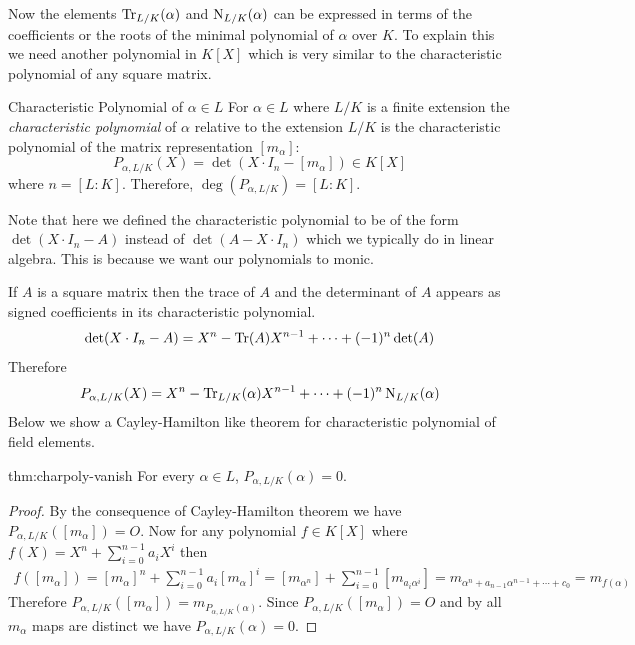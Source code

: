 Now the elements $\operatorname{Tr}_{L/K}(\alpha)$ and $\operatorname{N}_{L/K}(\alpha)$ can be expressed in terms of the coefficients or the roots of the minimal polynomial of $\alpha$ over $K$. To explain this we need another polynomial in $K[X]$ which is very similar to the characteristic polynomial of any square matrix.
\begin{Definition}{Characteristic Polynomial of $\alpha\in L$}{}
  For $\alpha\in L$ where $L/K$ is a finite extension the \emph{characteristic polynomial} of $\alpha$ relative to the extension $L/K$ is the characteristic polynomial of the matrix representation $[m_{\alpha}]$:
  $$P_{\alpha,L/K}(X)=\det(X\cdot I_n-[m_{\alpha}])\in K[X]$$
  where $n=[L\colon K]$. Therefore, $\deg(P_{\alpha,L/K})=[L\colon K]$.
\end{Definition}

Note that here we defined the characteristic polynomial to be of the form $\det(X\cdot I_n-A)$ instead of $\det(A-X\cdot I_n)$ which we typically do in linear algebra. This is because we want our polynomials to monic.

If $A$ is a square matrix then the trace of $A$ and the determinant of $A$ appears as signed coefficients in its characteristic polynomial.$$\det(X\cdot I_n-A)=X^n-\operatorname{Tr}(A)X^{n-1}+\cdots +(-1)^n\det(A)$$
Therefore \begin{equation}\label{eq:char-poly-trace-norm}
  P_{\alpha,L/K}(X)=X^n-\operatorname{Tr}_{L/K}(\alpha)X^{n-1}+\cdots +(-1)^n\operatorname{N}_{L/K}(\alpha)
\end{equation}Below we show a Cayley-Hamilton like theorem for characteristic polynomial of field elements.
\begin{Theorem}{}{thm:charpoly-vanish}
  For every $\alpha\in L$, $P_{\alpha,L/K}(\alpha)=0$.
\end{Theorem}
\begin{proof}
  By the consequence of Cayley-Hamilton theorem we have $P_{\alpha,L/K}([m_{\alpha}])=O$. Now for any polynomial $f\in K[X]$ where $f(X)=X^n+\sum_{i=0}^{n-1}a_iX^i$ then \begin{align*}
    f([m_{\alpha}]) = [m_{\alpha}]^n+\sum_{i=0}^{n-1}a_i[m_{\alpha}]^{i} = [m_{\alpha^n}]+\sum_{i=0}^{n-1}[m_{a_i\alpha^i}] = m_{\alpha^n+a_{n-1}\alpha^{n-1}+\cdots +c_0} = m_{f(\alpha)}
  \end{align*}Therefore $P_{\alpha,L/K}([m_{\alpha}])=m_{P_{\alpha,L/K}(\alpha)}$. Since $P_{\alpha,L/K}([m_{\alpha}])=O$ and by \MultMapPropslem all $m_{\alpha}$ maps are distinct we have $P_{\alpha,L/K}(\alpha)=0$.
\end{proof}

